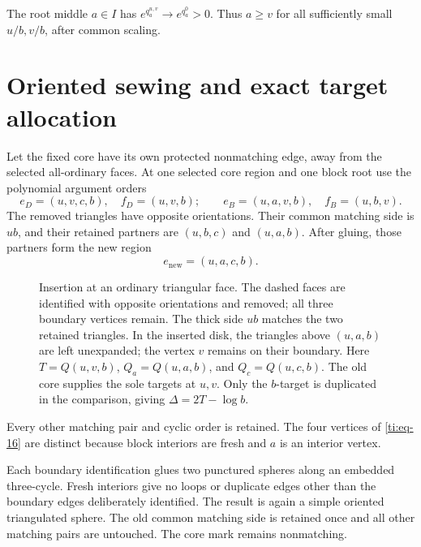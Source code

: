 \documentclass[11pt]{article}
\numberwithin{equation}{section}
\theoremstyle{definition}\newtheorem{definition}[theorem]{Definition}
\theoremstyle{remark}\newtheorem{remark}[theorem]{Remark}
\begin{document}
The root middle \(a\in I\) has \(e^{q_a^{u,v}}\to e^{q_a^0}>0\). Thus \(a\ge v\) for all sufficiently small \(u/b,v/b\), after common scaling.

\section{Oriented sewing and exact target allocation}\label{ti:sec-5}

Let the fixed core have its own protected nonmatching edge, away from the selected all-ordinary faces. At one selected core region and one block root use the polynomial argument orders
\begin{equation}\label{ti:eq-15}
e_D=(u,v,c,b),\quad f_D=(u,v,b);
\qquad
e_B=(u,a,v,b),\quad f_B=(u,b,v).
\end{equation}
The removed triangles have opposite orientations. Their common matching side is \(ub\), and their retained partners are \((u,b,c)\) and \((u,a,b)\). After gluing, those partners form the new region
\begin{equation}\label{ti:eq-16}
e_{\mathrm{new}}=(u,a,c,b).
\end{equation}

\begin{figure}[htbp]
\centering

\caption{Insertion at an ordinary triangular face. The dashed faces are
identified with opposite orientations and removed; all three boundary
vertices remain. The thick side \(ub\) matches the two retained
triangles. In the inserted disk, the triangles above \((u,a,b)\) are
left unexpanded; the vertex \(v\) remains on their boundary.
Here \(T=Q(u,v,b)\), \(Q_a=Q(u,a,b)\), and \(Q_c=Q(u,c,b)\).
The old core supplies the sole targets at \(u,v\).
Only the \(b\)-target is duplicated in the comparison, giving
\(\Delta=2T-\log b\).}
\label{fig:triangular-boundary-insertion}
\end{figure}

Every other matching pair and cyclic order is retained. The four vertices of \eqref{ti:eq-16} are distinct because block interiors are fresh and \(a\) is an interior vertex.

Each boundary identification glues two punctured spheres along an embedded three-cycle. Fresh interiors give no loops or duplicate edges other than the boundary edges deliberately identified. The result is again a simple oriented triangulated sphere. The old common matching side is retained once and all other matching pairs are untouched. The core mark remains nonmatching.
\end{document}
